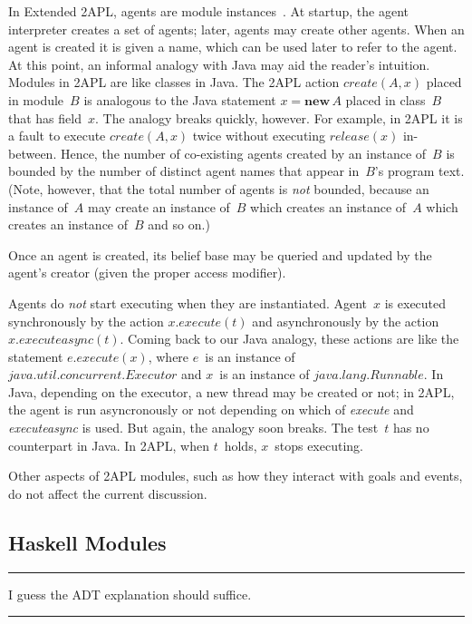 \documentclass[conference,compsoc]{IEEEtran}
\newenvironment{notes}{\medskip\hrule\nobreak\smallskip\narrower}{\smallskip\hrule\medskip}
\begin{document}
In Extended 2APL, agents are module
instances~\cite{DBLP:conf/prima/DastaniMS08}. At startup, the agent
interpreter creates a set of agents; later, agents may create other agents.
When an agent is created it is given a name, which can be used later to
refer to the agent. At this point, an informal analogy with Java may aid
the reader's intuition. Modules in 2APL are like classes in Java. The 2APL
action $\mathit{create}(A,x)$ placed in module~$B$ is analogous to the Java
statement $x=\mathbf{new}\,A$ placed in class~$B$ that has field~$x$.  The
analogy breaks quickly, however. For example, in 2APL it is a fault to
execute $\mathit{create}(A,x)$ twice without executing
$\mathit{release}(x)$ in-between. Hence, the number of co-existing agents
created by an instance of~$B$ is bounded by the number of distinct agent
names that appear in~$B$'s program text. (Note, however, that the total
number of agents is \emph{not} bounded, because an instance of~$A$ may
create an instance of~$B$ which creates an instance of~$A$ which creates
an instance of~$B$ and so on.)

Once an agent is created, its belief base may be queried and updated by the
agent's creator (given the proper access modifier).

Agents do \emph{not} start executing when they are instantiated. Agent~$x$
is executed synchronously by the action $x.\mathit{execute}(t)$ and
asynchronously by the action $x.\mathit{executeasync}(t)$. Coming back to
our Java analogy, these actions are like the statement
$e.\mathit{execute}(x)$, where $e$~is an instance of
$\mathit{java}.\mathit{util}.\mathit{concurrent}.\mathit{Executor}$ and
$x$~is an instance of $\mathit{java}.\mathit{lang}.\mathit{Runnable}$.  In
Java, depending on the executor, a new thread may be created or not; in
2APL, the agent is run asyncronously or not depending on which of
\textit{execute} and \textit{executeasync} is used. But again, the analogy
soon breaks. The test~$t$ has no counterpart in Java. In 2APL, when
$t$~holds, $x$~stops executing.

Other aspects of 2APL modules, such as how they interact with goals and
events, do not affect the current discussion.

\subsection{Haskell Modules}

\begin{notes}
I guess the ADT explanation should suffice.
\end{notes}
\end{document}
